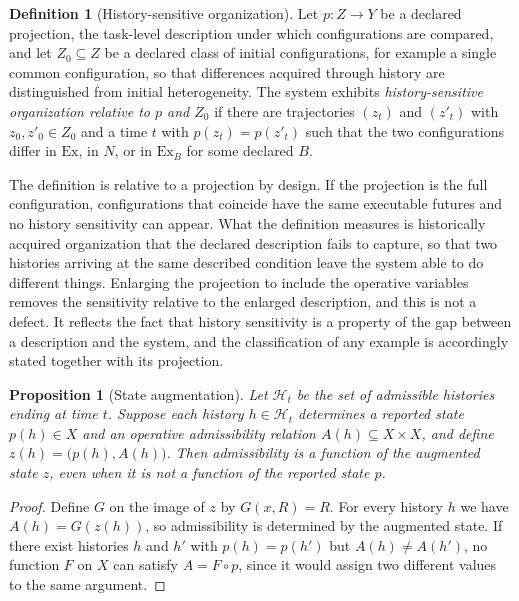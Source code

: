 \documentclass[11pt]{article}
\theoremstyle{definition}
\newtheorem{definition}{Definition}
\theoremstyle{plain}
\newtheorem{proposition}{Proposition}
\theoremstyle{remark}
\begin{document}
\begin{definition}[History-sensitive organization]
Let $p : Z \to Y$ be a declared projection, the task-level description under which configurations are compared, and let $Z_0 \subseteq Z$ be a declared class of initial configurations, for example a single common configuration, so that differences acquired through history are distinguished from initial heterogeneity. The system exhibits \emph{history-sensitive organization relative to $p$ and $Z_0$} if there are trajectories $(z_t)$ and $(z'_t)$ with $z_0, z'_0 \in Z_0$ and a time $t$ with $p(z_t) = p(z'_t)$ such that the two configurations differ in $\mathrm{Ex}$, in $N$, or in $\mathrm{Ex}_B$ for some declared $B$.
\end{definition}

The definition is relative to a projection by design. If the projection is the full configuration, configurations that coincide have the same executable futures and no history sensitivity can appear. What the definition measures is historically acquired organization that the declared description fails to capture, so that two histories arriving at the same described condition leave the system able to do different things. Enlarging the projection to include the operative variables removes the sensitivity relative to the enlarged description, and this is not a defect. It reflects the fact that history sensitivity is a property of the gap between a description and the system, and the classification of any example is accordingly stated together with its projection.

\begin{proposition}[State augmentation]
Let $\mathcal{H}_t$ be the set of admissible histories ending at time $t$. Suppose each history $h \in \mathcal{H}_t$ determines a reported state $p(h) \in X$ and an operative admissibility relation $A(h) \subseteq X \times X$, and define $z(h) = \bigl(p(h), A(h)\bigr)$. Then admissibility is a function of the augmented state $z$, even when it is not a function of the reported state $p$.
\end{proposition}

\begin{proof}
Define $G$ on the image of $z$ by $G(x,R) = R$. For every history $h$ we have $A(h) = G(z(h))$, so admissibility is determined by the augmented state. If there exist histories $h$ and $h'$ with $p(h) = p(h')$ but $A(h) \neq A(h')$, no function $F$ on $X$ can satisfy $A = F \circ p$, since it would assign two different values to the same argument.
\end{proof}
\end{document}
